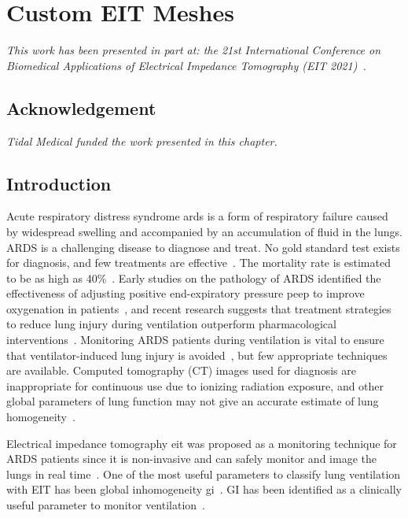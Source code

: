 \chapter{Custom EIT Meshes}
\label{chap:chapter-5}

\emph{This work has been presented in part at: 
 the 21st International Conference on Biomedical 
 Applications of Electrical Impedance Tomography (EIT 2021)~\parencite{stowe_generating_2021}.} 

\section*{Acknowledgement}
\emph{Tidal Medical funded the work presented in this chapter.}

\section{Introduction}
Acute respiratory distress syndrome \acrshort{ards} is a form of
respiratory failure caused by widespread swelling and 
accompanied by an accumulation of fluid in the 
lungs. 
ARDS is a challenging disease to diagnose and treat. 
No gold standard test exists for diagnosis, 
and few treatments are 
effective~\parencite{pham_fifty_2017}. The 
mortality rate is estimated to be as high 
as 40\%~\parencite{abe_epidemiology_2018}.
Early studies on the pathology of ARDS identified 
the effectiveness of adjusting positive end-expiratory pressure
\acrshort{peep} to improve oxygenation in 
patients~\parencite{petty_cards_2001,ashbaugh_acute_1967}, 
and recent research suggests that treatment strategies to 
reduce lung injury during ventilation outperform
pharmacological interventions~\parencite{duggal_pharmacological_2015}. 
Monitoring ARDS patients during ventilation is vital to ensure that 
ventilator-induced lung injury is avoided~\parencite{bates_ventilator-induced_2018}, 
but few appropriate techniques are available. Computed tomography (CT) images used for
diagnosis are inappropriate for continuous use due to ionizing radiation 
exposure, and other global parameters of lung function may not give an accurate
estimate of lung homogeneity~\parencite{zhao_evaluation_2009}. 

Electrical impedance tomography \acrshort{eit} was proposed
as a monitoring technique for ARDS patients since it is non-invasive 
and can safely monitor and image the lungs in 
real time~\parencite{denai_absolute_2010,frerichs_chest_2017}.
One of the most useful parameters to classify lung ventilation 
with EIT has been global inhomogeneity 
\acrshort{gi}~\parencite{sribar_influence_2020,hough_effect_2016,humphreys_effect_2011,
zhao_regional_2012,hochhausen_comparison_2019,hsu_regional_2017}.
GI has been identified as a clinically useful parameter to monitor 
ventilation~\parencite{frerichs_chest_2019}.

